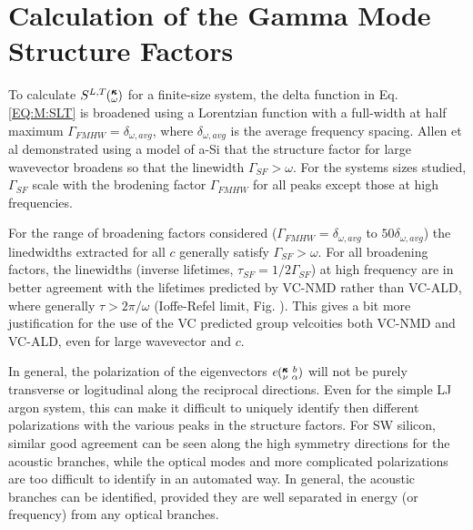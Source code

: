\documentclass[aps,prb,onecolumn,preprint,superscriptaddress,amsmath,amssymb,floatfix]{revtex4}
\newcommand{\kvba}{\mspace{-4.0mu}\left(\mspace{-8.0mu}
\begin{smallmatrix} &\pmb{\kappa} &b \\ &\nu &\alpha\end{smallmatrix}
\mspace{-3.0mu}\right)}
\newcommand{\kw}{\mspace{-4.0mu}\left(\mspace{-8.0mu}
\begin{smallmatrix}&\pmb{\kappa} \\&\omega\end{smallmatrix}
\mspace{-3.0mu}\right)}
\begin{document}
\section{\label{A:SF}Calculation of the Gamma Mode Structure Factors}

To calculate 
$S^{L,T}\kw$ for a finite-size system, the 
delta function in Eq. \eqref{EQ:M:SLT} is broadened using a Lorentzian 
function with a full-width at half maximum 
$\Gamma_{FMHW} = \delta_{\omega,avg}$, 
where 
$\delta_{\omega,avg}$ is the average frequency spacing. 
Allen et al\cite{allen_diffusons_1999} 
demonstrated using a model of 
a-Si that the structure factor 
for large wavevector broadens so that the 
linewidth $\Gamma_{SF} > \omega$.
\cite{taraskin_determination_1999}
For the systems sizes studied, $\Gamma_{SF}$ 
scale with the brodening factor 
$\Gamma_{FMHW}$ for all peaks 
except those at high frequencies. 

For the range of broadening factors 
considered ($\Gamma_{FMHW} = \delta_{\omega,avg}$ to $50\delta_{\omega,avg}$) 
the linedwidths extracted for all $c$ 
generally satisfy $\Gamma_{SF} > \omega$. 
For all broadening factors, the linewidths 
(inverse lifetimes, $\tau_{SF} = 1/2\Gamma_{SF}$) 
at high frequency are in better 
agreement with the lifetimes predicted 
by VC-NMD rather than VC-ALD,
where generally $\tau > 2\pi/\omega$ (Ioffe-Refel limit, Fig. ).
\cite{taraskin_determination_1999} This gives a bit more  
justification for the use of the VC predicted group velcoities 
both VC-NMD and VC-ALD, even for large wavevector and $c$. 

In general, the polarization of the eigenvectors $e\kvba$ will not 
be purely transverse or logitudinal along the reciprocal directions. 
Even for the simple LJ argon system, this can make it difficult to 
uniquely identify then different polarizations with the various 
peaks in the structure factors. For SW silicon, similar good agreement 
can be seen along the high symmetry directions for the acoustic branches, 
while the optical modes 
and more complicated polarizations are too difficult to identify in 
an automated way. 
In general, the acoustic branches can be identified, provided they are 
well separated in energy (or frequency) from any optical branches.
\cite{feldman_numerical_1999,thomas_predicting_2010} 

\end{document}
